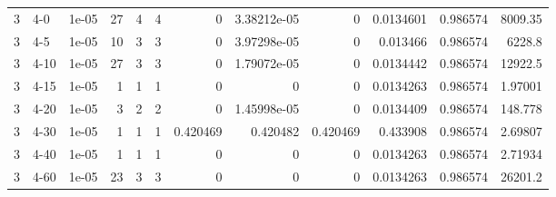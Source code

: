\begin{tabular}{rlrrrrrrrrrr}
     3 & 4-0    &      1e-05 &          27 &                 4 &                 4 &        0        &     3.38212e-05 &         0        &        0.0134601 &               0.986574 &        8009.35     \\
     3 & 4-5    &      1e-05 &          10 &                 3 &                 3 &        0        &     3.97298e-05 &         0        &        0.013466  &               0.986574 &        6228.8      \\
     3 & 4-10   &      1e-05 &          27 &                 3 &                 3 &        0        &     1.79072e-05 &         0        &        0.0134442 &               0.986574 &       12922.5      \\
     3 & 4-15   &      1e-05 &           1 &                 1 &                 1 &        0        &     0           &         0        &        0.0134263 &               0.986574 &           1.97001  \\
     3 & 4-20   &      1e-05 &           3 &                 2 &                 2 &        0        &     1.45998e-05 &         0        &        0.0134409 &               0.986574 &         148.778    \\
     3 & 4-30   &      1e-05 &           1 &                 1 &                 1 &        0.420469 &     0.420482    &         0.420469 &        0.433908  &               0.986574 &           2.69807  \\
     3 & 4-40   &      1e-05 &           1 &                 1 &                 1 &        0        &     0           &         0        &        0.0134263 &               0.986574 &           2.71934  \\
     3 & 4-60   &      1e-05 &          23 &                 3 &                 3 &        0        &     0           &         0        &        0.0134263 &               0.986574 &       26201.2      \\
\hline
\end{tabular}
